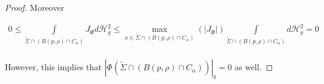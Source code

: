\documentclass{amsart}
\newcommand{\hm}{\mathscr{H}}
\newcommand{\ts}{\tilde{\Sigma}}
\theoremstyle{named}
\begin{document}
\begin{proof}
        Moreover 

        \begin{gather*}
            0 \leq \int\limits_{\ts \cap (B(p,\rho) \cap C_{\alpha})} J_{\Phi} d\hm^{2}_g \leq \max\limits_{x \in \ts \cap (B(p,\rho) \cap C_{\alpha})} ( |J_{\Phi}|) \int\limits_{\ts \cap (B(p,\rho) \cap C_{\alpha})} d\hm^{2}_g = 0\\ 
        \end{gather*}

       However, this implies that $|\Phi(\ts \cap (B(p,\rho) \cap C_{\alpha}))|_{\delta} = 0$ as well.
        
\end{proof}

\end{document}
